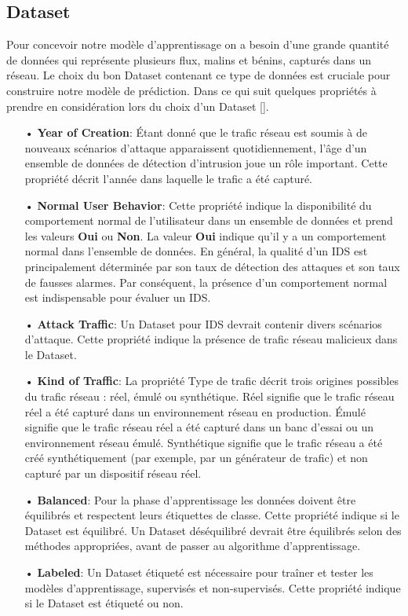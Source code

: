 \subsection{Dataset}
Pour concevoir notre modèle d'apprentissage on a besoin d'une grande quantité de données qui représente plusieurs flux, malins et bénins, capturés dans un réseau. Le choix du bon Dataset contenant ce type de données est cruciale pour construire notre modèle de prédiction. Dans ce qui suit quelques propriétés à prendre en considération lors du choix d'un Dataset [\cite{12}].\\
\begin{itemize}
\item[•]\textbf{Year of Creation}: Étant donné que le trafic réseau est soumis à de nouveaux scénarios d’attaque apparaissent quotidiennement, l’âge d’un ensemble de données de détection d’intrusion joue un rôle important. Cette propriété décrit l’année dans laquelle le trafic a été capturé.\\
\item[•]\textbf{Normal User Behavior}: Cette propriété indique la disponibilité du comportement normal de l’utilisateur dans un ensemble de données et prend les valeurs \textbf{Oui} ou \textbf{Non}. La valeur \textbf{Oui} indique qu’il y a un comportement normal dans l’ensemble de données. En général, la qualité d’un IDS est principalement déterminée par son taux de détection des attaques et son taux de fausses alarmes. Par conséquent, la présence d’un comportement normal est indispensable pour évaluer un IDS.\\
\item[•]\textbf{Attack Traffic}: Un Dataset pour IDS devrait contenir divers scénarios d’attaque. Cette propriété indique la présence de trafic réseau malicieux dans le Dataset.\\
\item[•]\textbf{Kind of Traffic}: La propriété Type de trafic décrit trois origines possibles du trafic réseau : réel, émulé ou synthétique. Réel signifie que le trafic réseau réel a été capturé dans un environnement réseau en production. Émulé signifie que le trafic réseau réel a été capturé dans un banc d’essai ou un environnement réseau émulé. Synthétique signifie que le trafic réseau a été créé synthétiquement (par exemple, par un générateur de trafic) et non capturé par un dispositif réseau réel.\\
\item[•]\textbf{Balanced}: Pour la phase d'apprentissage les données doivent être équilibrés et respectent  leurs étiquettes de classe. Cette propriété indique si le Dataset est équilibré. Un Dataset déséquilibré devrait être équilibrés selon des méthodes appropriées, avant de passer au algorithme d'apprentissage.\\
\item[•]\textbf{Labeled}: Un Dataset étiqueté est nécessaire pour traîner et tester les modèles d’apprentissage, supervisés et non-supervisés. Cette propriété indique si le Dataset est étiqueté ou non. 
\end{itemize}

